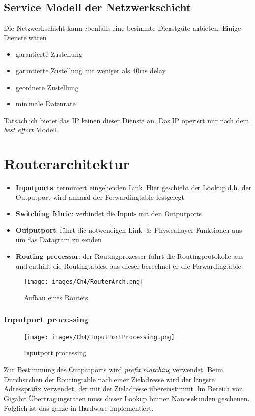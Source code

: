 \subsection{Service Modell der Netzwerkschicht}
Die Netzwerkschicht kann ebenfalls eine besimmte Dienstgüte anbieten. Einige Dienste wären
\begin{itemize}
    \item garantierte Zustellung
    \item garantierte Zustellung mit weniger als 40ms delay
    \item geordnete Zustellung
    \item minimale Datenrate
\end{itemize}

Tatsächlich bietet das IP keinen dieser Dienste an. Das IP operiert nur nach dem \emph{best effort} Modell.

\section{Routerarchitektur}
\begin{itemize}
    \item \textbf{Inputports}: terminiert eingehenden Link. Hier geschieht der Lookup d.h. der Outputport wird anhand der Forwardingtable festgelegt
    \item \textbf{Switching fabric}: verbindet die Input- mit den Outputports
    \item \textbf{Outputport}: führt die notwendigen Link- \& Physicallayer Funktionen aus um das Datagram zu senden
    \item \textbf{Routing processor}: der Routingprozessor führt die Routingprotokolle aus und enthält die Routingtables, aus dieser berechnet er die Forwardingtable
\end{itemize}

\begin{figure}[H]
    \centering
    \texttt{[image: images/Ch4/RouterArch.png]}
    \caption{Aufbau eines Routers}
    \label{Ch04-Routers-Arch}
\end{figure}

\subsubsection{Inputport processing}
\begin{figure}[H]
    \centering
    \texttt{[image: images/Ch4/InputPortProcessing.png]}
    \caption{Inputport processing}
    \label{Ch04-Inputportprocessing}
\end{figure}
 Zur Bestimmung des Outputports wird \emph{prefix matching} verwendet. Beim Durchsuchen der Routingtable nach einer Zieladresse wird der längste Adresspräfix verwendet, der mit der Zieladresse übereinstimmt. Im Bereich von Gigabit Übertragungsraten muss dieser Lookup binnen Nanosekunden geschenen. Folglich ist das ganze in Hardware implementiert.
 
